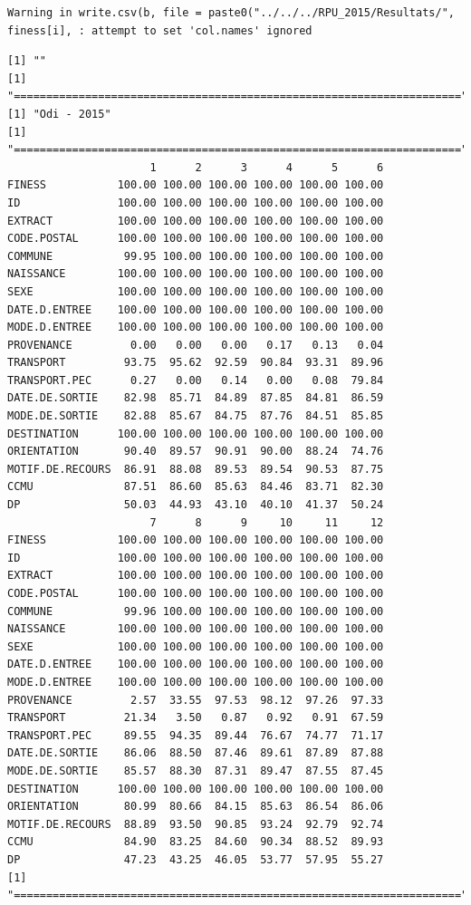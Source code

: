 \documentclass[]{article}
\begin{document}
\begin{verbatim}
Warning in write.csv(b, file = paste0("../../../RPU_2015/Resultats/",
finess[i], : attempt to set 'col.names' ignored
\end{verbatim}

\begin{verbatim}
[1] ""
[1] "====================================================================="
[1] "Odi - 2015"
[1] "====================================================================="
                      1      2      3      4      5      6
FINESS           100.00 100.00 100.00 100.00 100.00 100.00
ID               100.00 100.00 100.00 100.00 100.00 100.00
EXTRACT          100.00 100.00 100.00 100.00 100.00 100.00
CODE.POSTAL      100.00 100.00 100.00 100.00 100.00 100.00
COMMUNE           99.95 100.00 100.00 100.00 100.00 100.00
NAISSANCE        100.00 100.00 100.00 100.00 100.00 100.00
SEXE             100.00 100.00 100.00 100.00 100.00 100.00
DATE.D.ENTREE    100.00 100.00 100.00 100.00 100.00 100.00
MODE.D.ENTREE    100.00 100.00 100.00 100.00 100.00 100.00
PROVENANCE         0.00   0.00   0.00   0.17   0.13   0.04
TRANSPORT         93.75  95.62  92.59  90.84  93.31  89.96
TRANSPORT.PEC      0.27   0.00   0.14   0.00   0.08  79.84
DATE.DE.SORTIE    82.98  85.71  84.89  87.85  84.81  86.59
MODE.DE.SORTIE    82.88  85.67  84.75  87.76  84.51  85.85
DESTINATION      100.00 100.00 100.00 100.00 100.00 100.00
ORIENTATION       90.40  89.57  90.91  90.00  88.24  74.76
MOTIF.DE.RECOURS  86.91  88.08  89.53  89.54  90.53  87.75
CCMU              87.51  86.60  85.63  84.46  83.71  82.30
DP                50.03  44.93  43.10  40.10  41.37  50.24
                      7      8      9     10     11     12
FINESS           100.00 100.00 100.00 100.00 100.00 100.00
ID               100.00 100.00 100.00 100.00 100.00 100.00
EXTRACT          100.00 100.00 100.00 100.00 100.00 100.00
CODE.POSTAL      100.00 100.00 100.00 100.00 100.00 100.00
COMMUNE           99.96 100.00 100.00 100.00 100.00 100.00
NAISSANCE        100.00 100.00 100.00 100.00 100.00 100.00
SEXE             100.00 100.00 100.00 100.00 100.00 100.00
DATE.D.ENTREE    100.00 100.00 100.00 100.00 100.00 100.00
MODE.D.ENTREE    100.00 100.00 100.00 100.00 100.00 100.00
PROVENANCE         2.57  33.55  97.53  98.12  97.26  97.33
TRANSPORT         21.34   3.50   0.87   0.92   0.91  67.59
TRANSPORT.PEC     89.55  94.35  89.44  76.67  74.77  71.17
DATE.DE.SORTIE    86.06  88.50  87.46  89.61  87.89  87.88
MODE.DE.SORTIE    85.57  88.30  87.31  89.47  87.55  87.45
DESTINATION      100.00 100.00 100.00 100.00 100.00 100.00
ORIENTATION       80.99  80.66  84.15  85.63  86.54  86.06
MOTIF.DE.RECOURS  88.89  93.50  90.85  93.24  92.79  92.74
CCMU              84.90  83.25  84.60  90.34  88.52  89.93
DP                47.23  43.25  46.05  53.77  57.95  55.27
[1] "====================================================================="
\end{verbatim}
\end{document}
